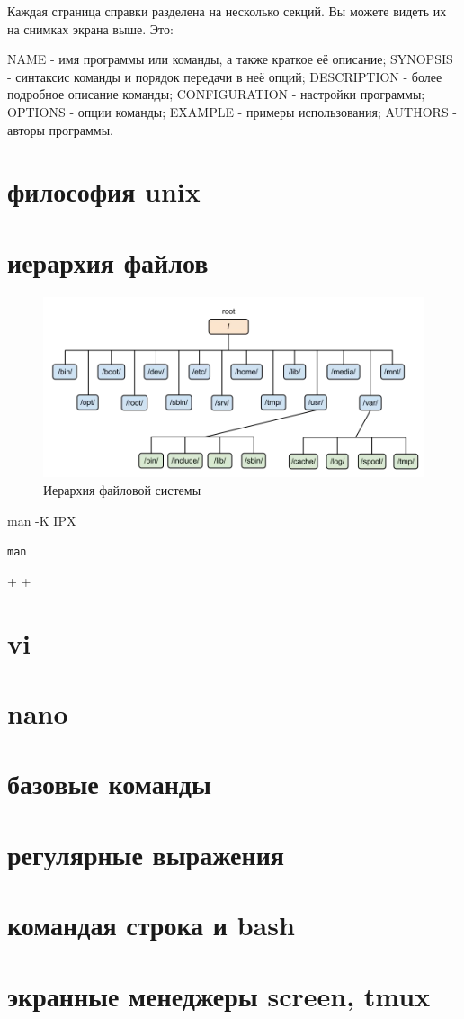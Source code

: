 Каждая страница справки разделена на несколько секций. Вы можете видеть их на снимках экрана выше. Это:

NAME - имя программы или команды, а также краткое её описание;
SYNOPSIS - синтаксис команды и порядок передачи в неё опций;
DESCRIPTION - более подробное описание команды;
CONFIGURATION - настройки программы;
OPTIONS - опции команды;
EXAMPLE - примеры использования;
AUTHORS - авторы программы.




\section{философия unix}
\section{иерархия файлов}

\begin{figure}
	\includegraphics[width=\textwidth]{img/ch1/hfs.png}
	\caption{Иерархия файловой системы}
	\label{fig:galaxy}
\end{figure}



man -K IPX

\texttt{man}

 +  + 

\section{vi}
\section{nano}
\section{базовые команды}
\section{регулярные выражения}
\section{командая строка и bash}
\section{экранные менеджеры screen, tmux}

